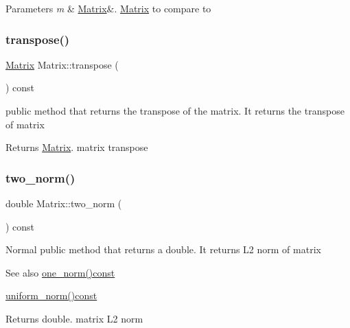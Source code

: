 \begin{DoxyParams}{Parameters}
{\em m} & \mbox{\hyperlink{classMatrix}{Matrix}}\&. \mbox{\hyperlink{classMatrix}{Matrix}} to compare to \\
\hline
\end{DoxyParams}
\mbox{\label{classMatrix_a759661b75b9681f3a89ff75e27933b3a}} 
\subsubsection{\texorpdfstring{transpose()}{transpose()}}
{\footnotesize\ttfamily \mbox{\hyperlink{classMatrix}{Matrix}} Matrix\+::transpose (\begin{DoxyParamCaption}{ }\end{DoxyParamCaption}) const}

public method that returns the transpose of the matrix. It returns the transpose of matrix \begin{DoxyReturn}{Returns}
\mbox{\hyperlink{classMatrix}{Matrix}}. matrix transpose 
\end{DoxyReturn}
\mbox{\label{classMatrix_aac496af05ec7aa26afc2b9c6d0ab8b66}} 
\subsubsection{\texorpdfstring{two\+\_\+norm()}{two\_norm()}}
{\footnotesize\ttfamily double Matrix\+::two\+\_\+norm (\begin{DoxyParamCaption}{ }\end{DoxyParamCaption}) const}

Normal public method that returns a double. It returns L2 norm of matrix \begin{DoxySeeAlso}{See also}
\mbox{\hyperlink{classMatrix_af4d468252f3ecbbcaa5726c76e332b4c}{one\+\_\+norm()const}} 

\mbox{\hyperlink{classMatrix_a43066c7fe6418aad40170b85415063e8}{uniform\+\_\+norm()const}} 
\end{DoxySeeAlso}
\begin{DoxyReturn}{Returns}
double. matrix L2 norm 
\end{DoxyReturn}
\mbox{\label{classMatrix_a43066c7fe6418aad40170b85415063e8}} 
